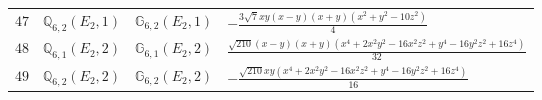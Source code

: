 \documentclass[fleqn,8pt,landscape]{jsarticle}
\begin{document}
\begin{table}[ht!]
\begin{center}
\begin{tabular}{cccl}
$ 47 $ & $ \mathbb{Q}_{6,2}(E_{2},1) $ & $ \mathbb{G}_{6,2}(E_{2},1) $ & $ - \frac{3 \sqrt{7} x y \left(x - y\right) \left(x + y\right) \left(x^{2} + y^{2} - 10 z^{2}\right)}{4} $ \\
$ 48 $ & $ \mathbb{Q}_{6,1}(E_{2},2) $ & $ \mathbb{G}_{6,1}(E_{2},2) $ & $ \frac{\sqrt{210} \left(x - y\right) \left(x + y\right) \left(x^{4} + 2 x^{2} y^{2} - 16 x^{2} z^{2} + y^{4} - 16 y^{2} z^{2} + 16 z^{4}\right)}{32} $ \\
$ 49 $ & $ \mathbb{Q}_{6,2}(E_{2},2) $ & $ \mathbb{G}_{6,2}(E_{2},2) $ & $ - \frac{\sqrt{210} x y \left(x^{4} + 2 x^{2} y^{2} - 16 x^{2} z^{2} + y^{4} - 16 y^{2} z^{2} + 16 z^{4}\right)}{16} $ \\
 \hline \hline
\end{tabular}
\end{center}
\end{table}
\end{document}
